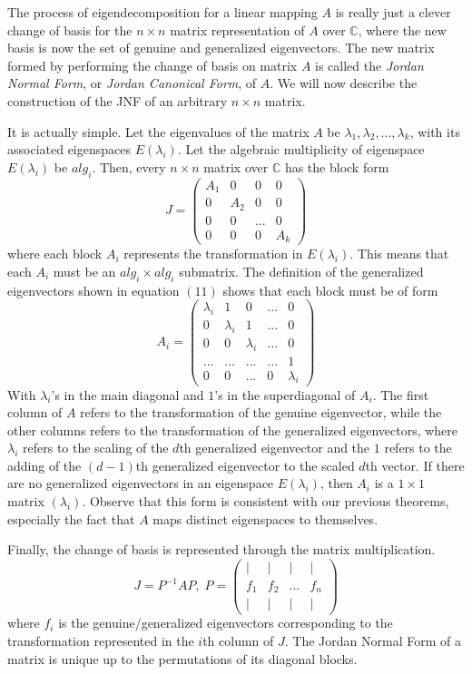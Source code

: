 \documentclass{article}
\theoremstyle{remark}
\theoremstyle{definition}
\begin{document}
    The process of eigendecomposition for a linear mapping $A$ is really just a clever change of basis for the $n \times n$ matrix representation of $A$ over $\mathbb{C}$, where the new basis is now the set of genuine and generalized eigenvectors. The new matrix formed by performing the change of basis on matrix $A$ is called the \textit{Jordan Normal Form}, or \textit{Jordan Canonical Form}, of $A$. We will now describe the construction of the JNF of an arbitrary $n \times n$ matrix. 

    It is actually simple. Let the eigenvalues of the matrix $A$ be $\lambda_1, \lambda_2, ..., \lambda_k$, with its associated eigenspaces $E(\lambda_i)$. Let the algebraic multiplicity of eigenspace $E(\lambda_i)$ be $alg_i$. Then, every $n \times n$ matrix over $\mathbb{C}$ has the block form 
    \[ J = \begin{pmatrix}
    A_1&0&0&0\\
    0&A_2&0&0\\
    0&0&...&0\\
    0&0&0&A_k
    \end{pmatrix}\]
    where each block $A_i$ represents the transformation in $E(\lambda_i)$. This means that each $A_i$ must be an $alg_i \times alg_i$ submatrix. The definition of the generalized eigenvectors shown in equation $(11)$ shows that each block must be of form 
    \[A_i = \begin{pmatrix}
    \lambda_i & 1 & 0 & ... & 0\\
    0 &\lambda_i & 1 &...&0 \\
    0&0&\lambda_i&...&0\\
    ...&...&...&...&1\\
    0&0&...&0&\lambda_i
    \end{pmatrix}\]
    With $\lambda_i$'s in the main diagonal and $1$'s in the superdiagonal of $A_i$. The first column of $A$ refers to the transformation of the genuine eigenvector, while the other columns refers to the transformation of the generalized eigenvectors, where $\lambda_i$ refers to the scaling of the $d$th generalized eigenvector and the $1$ refers to the adding of the $(d-1)$th generalized eigenvector to the scaled $d$th vector. If there are no generalized eigenvectors in an eigenspace $E(\lambda_i)$, then $A_i$ is a $1 \times 1$ matrix $( \lambda_i )$. Observe that this form is consistent with our previous theorems, especially the fact that $A$ maps distinct eigenspaces to themselves. 

    Finally, the change of basis is represented through the matrix multiplication. 
    \[J = P^{-1} A P, \; P = \begin{pmatrix}
    |&|&|&| \\ 
    f_1&f_2&...&f_n \\
    |&|&|&|
    \end{pmatrix} \]
    where $f_i$ is the genuine/generalized eigenvectors corresponding to the transformation represented in the $i$th column of $J$. The Jordan Normal Form of a matrix is unique up to the permutations of its diagonal blocks. 
\end{document}
